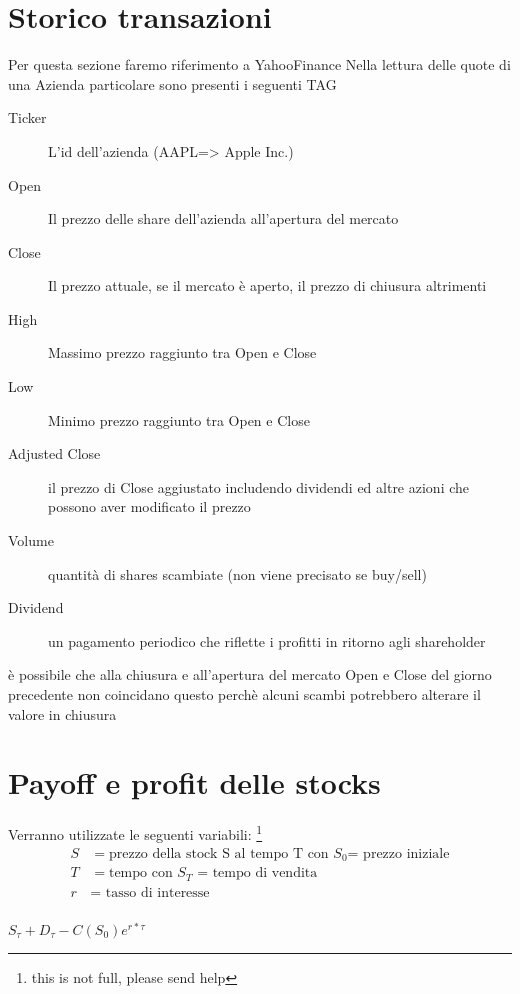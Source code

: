 \documentclass[a4paper,11pt]{report}
\begin{document}
{%

\section{Storico transazioni}
	Per questa sezione faremo riferimento a YahooFinance \newline
	Nella lettura delle quote di una Azienda particolare sono presenti i seguenti TAG \newline
\begin{description}
	\item[Ticker] L'id dell'azienda (AAPL=> Apple Inc.)
	\item[Open] Il prezzo delle share dell'azienda all'apertura del mercato
	\item[Close] Il prezzo attuale, se il mercato è aperto, il prezzo di chiusura altrimenti
	\item[High] Massimo prezzo raggiunto tra Open e Close
	\item[Low] Minimo prezzo raggiunto tra Open e Close
	\item[Adjusted Close] il prezzo di Close aggiustato includendo dividendi ed altre azioni che possono aver modificato il prezzo
	\item[Volume] quantità di shares scambiate (non viene precisato se buy/sell)
	\item[Dividend] un pagamento periodico che riflette i profitti in ritorno agli shareholder
\end{description}
è possibile che alla chiusura e all'apertura del mercato Open e Close del giorno precedente non coincidano \newline
questo perchè alcuni scambi potrebbero alterare il valore in chiusura %
\newpage


\section{Payoff e profit delle stocks}
	Verranno utilizzate le seguenti variabili:
\footnote {this is not full, please send help}
\begin{align*} %
	S &= {\text {prezzo della stock S al tempo T con $S_0$= prezzo iniziale}}\\
	T &= {\text {tempo con $S_T$ = tempo di vendita}}\\
	r &= {\text { tasso di interesse}}\\
\end{align*}
\begin{center}
	$S_\tau + D_\tau - C(S_0)e^{r*\tau}$
\end{center}
}
\end{document}
